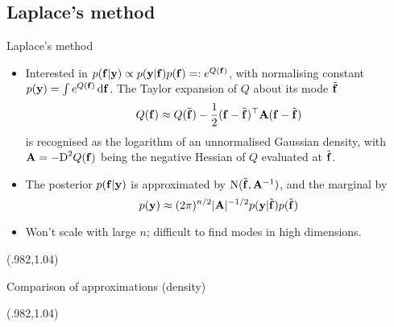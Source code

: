 \subsection{Laplace's method}
\begin{frame}[label=laplace]{Laplace's method}
  \vspace{-15pt}
  \begin{itemize}[<+->]\setlength\itemsep{0.8em}
    \item Interested in $p({\mathbf f}|{\mathbf y}) \propto p({\mathbf y}|{\mathbf f})p({\mathbf f}) =: e^{Q({\mathbf f})}$, with normalising constant $p({\mathbf y}) = \int e^{Q({\mathbf f})} \, \text{d}{\mathbf f}$. The Taylor expansion of $Q$ about its mode $\tilde{{\mathbf f}}$
    \[
      Q({\mathbf f}) \approx Q(\tilde{{\mathbf f}}) - \frac{1}{2} ({\mathbf f} - \tilde{{\mathbf f}})^\top{\mathbf A}({\mathbf f} - \tilde{{\mathbf f}}) 
    \]
    is recognised as the logarithm of an unnormalised Gaussian density, with ${\mathbf A} = -\text{D}^2 Q({\mathbf f})$ being the negative Hessian of $Q$ evaluated at  $\tilde{{\mathbf f}}$.
    \item The posterior $p({\mathbf f}|{\mathbf y})$ is approximated by $\operatorname{N}(\tilde{{\mathbf f}}, {\mathbf A}^{-1})$, and the marginal by
    \[
      p({\mathbf y}) \approx (2\pi)^{n/2} \vert {\mathbf A} \vert^{-1/2}  p({\mathbf y}|\tilde{{\mathbf f}})p(\tilde{{\mathbf f}})
    \]
    \item Won't scale with large $n$; difficult to find modes in high dimensions.
  \end{itemize}
  
  \begin{textblock*}{3cm}(.982\textwidth,1.04\textheight)%
    \hyperlink{quality}{}      
  \end{textblock*}
\end{frame}

\begin{frame}[label=varcompare]{Comparison of approximations (density)}
  \vspace{-5pt}
  
  \begin{textblock*}{3cm}(.982\textwidth,1.04\textheight)%
    \hyperlink{quality}{}      
  \end{textblock*}
\end{frame}

